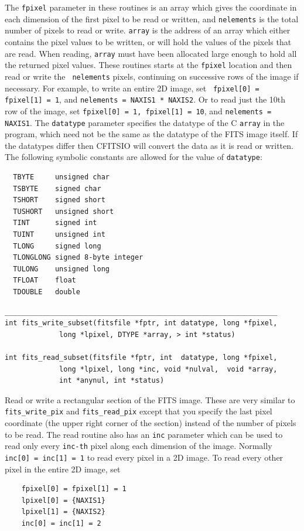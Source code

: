 \documentclass[11pt]{article}
\begin{document}
The {\tt fpixel} parameter in these routines is an array which gives
the coordinate in each dimension of the first pixel to be read or
written, and {\tt nelements} is the total number of pixels to read or
write.  {\tt array} is the address of an array which either contains
the pixel values to be written, or will hold the values of the pixels
that are read.  When reading, {\tt array} must have been allocated
large enough to hold all the returned pixel values.  These routines
starts at the {\tt fpixel} location and then read or write the {\tt
nelements} pixels, continuing on successive rows of the image if
necessary.  For example, to write an entire 2D image, set {\tt
fpixel[0] = fpixel[1] = 1}, and {\tt nelements = NAXIS1 * NAXIS2}.  Or
to read just the 10th row of the image, set {\tt fpixel[0] = 1,
fpixel[1] = 10}, and {\tt nelements = NAXIS1}.  The {\tt datatype}
parameter specifies the datatype of the C {\tt array} in the program,
which need not be the same as the datatype of the FITS image itself.
If the datatypes differ then CFITSIO will convert the data as it is
read or written.  The following symbolic constants are allowed for the
value of {\tt datatype}:
\begin{verbatim}
  TBYTE     unsigned char
  TSBYTE    signed char
  TSHORT    signed short
  TUSHORT   unsigned short
  TINT      signed int
  TUINT     unsigned int
  TLONG     signed long
  TLONGLONG signed 8-byte integer
  TULONG    unsigned long
  TFLOAT    float
  TDOUBLE   double
\end{verbatim}


\begin{verbatim}
_________________________________________________________________
int fits_write_subset(fitsfile *fptr, int datatype, long *fpixel,
             long *lpixel, DTYPE *array, > int *status)

int fits_read_subset(fitsfile *fptr, int  datatype, long *fpixel,
             long *lpixel, long *inc, void *nulval,  void *array,
             int *anynul, int *status)
\end{verbatim}

Read or write a rectangular section of the FITS image.  These are very
similar to {\tt fits\_write\_pix} and {\tt fits\_read\_pix} except that
you specify the last pixel coordinate (the upper right corner of the
section) instead of the number of pixels to be read.  The read routine
also has an {\tt inc} parameter which can be used to read only every
{\tt inc-th} pixel along each dimension of the image.  Normally  {\tt
inc[0] = inc[1] = 1} to read every pixel in a 2D image.  To read every
other pixel in the entire 2D image, set
\begin{verbatim}
    fpixel[0] = fpixel[1] = 1
    lpixel[0] = {NAXIS1}
    lpixel[1] = {NAXIS2}  
    inc[0] = inc[1] = 2  
\end{verbatim}
\end{document}
